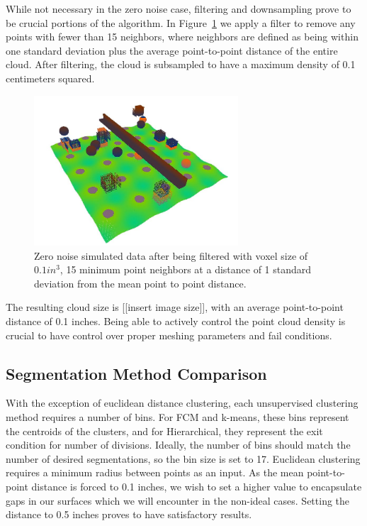 \documentclass[12pt]{drexelthesis}
\let\Oldsubsection\subsection
\renewcommand{\subsection}{\FloatBarrier\Oldsubsection}
\begin{document}
While not necessary in the zero noise case, filtering and downsampling prove to be crucial portions of the algorithm. In Figure~\ref{zeronoise:filtered} we apply a filter to remove any points with fewer than 15 neighbors, where neighbors are defined as being within one standard deviation plus the average point-to-point distance of the entire cloud. After filtering, the cloud is subsampled to have a maximum density of 0.1 centimeters squared.


\begin{figure}[!ht]
	\centering
		\includegraphics[width=3in]{simulated-lab-scan/0noise/sim-lab-0noise-DS01-k15std1.jpg}
		\caption[Zero noise simulated data after being filtered with voxel size of 0.1 $in^{3}$, 15 minimum point neighbors at a distance of 1 standard deviation from the mean point to point distance]{\centering Zero noise simulated data after being filtered with voxel size of $0.1 in^{3}$, 15 minimum point neighbors at a distance of 1 standard deviation from the mean point to point distance.}
	\label{zeronoise:filtered}
\end{figure}

The resulting cloud size is [[insert image size]], with an average point-to-point distance of 0.1 inches. Being able to actively control the point cloud density is crucial to have control over proper meshing parameters and fail conditions.

\subsection{Segmentation Method Comparison}

With the exception of euclidean distance clustering, each unsupervised clustering method requires a number of bins. For FCM and k-means, these bins represent the centroids of the clusters, and for Hierarchical, they represent the exit condition for number of divisions. Ideally, the number of bins should match the number of desired segmentations, so the bin size is set to 17. Euclidean clustering requires a minimum radius between points as an input. As the mean point-to-point distance is forced to 0.1 inches, we wish to set a higher value to encapsulate gaps in our surfaces which we will encounter in the non-ideal cases. Setting the distance to 0.5 inches proves to have satisfactory results.
\end{document}
